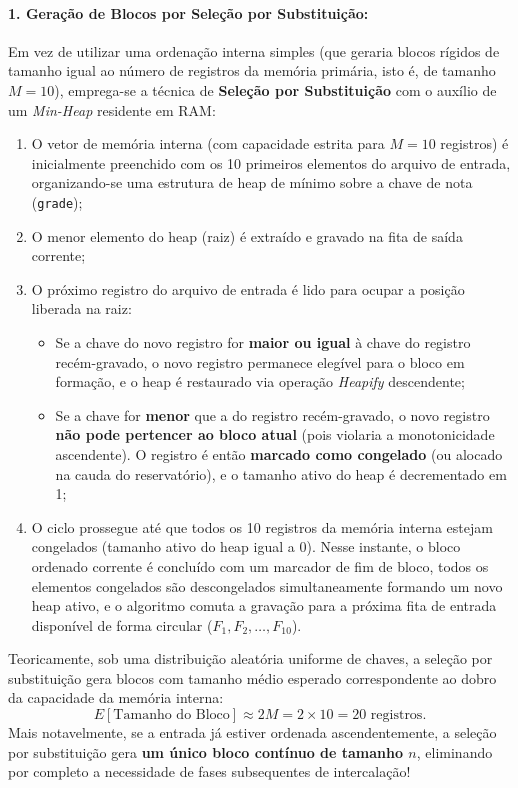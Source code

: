 \documentclass[12pt,a4paper]{article}
\begin{document}
\paragraph{1. Geração de Blocos por Seleção por Substituição:}
Em vez de utilizar uma ordenação interna simples (que geraria blocos rígidos de tamanho igual ao número de registros da memória primária, isto é, de tamanho $M = 10$), emprega-se a técnica de \textbf{Seleção por Substituição} com o auxílio de um \textit{Min-Heap} residente em RAM:
\begin{enumerate}
    \item O vetor de memória interna (com capacidade estrita para $M = 10$ registros) é inicialmente preenchido com os 10 primeiros elementos do arquivo de entrada, organizando-se uma estrutura de heap de mínimo sobre a chave de nota (\texttt{grade});
    \item O menor elemento do heap (raiz) é extraído e gravado na fita de saída corrente;
    \item O próximo registro do arquivo de entrada é lido para ocupar a posição liberada na raiz:
    \begin{itemize}
        \item Se a chave do novo registro for \textbf{maior ou igual} à chave do registro recém-gravado, o novo registro permanece elegível para o bloco em formação, e o heap é restaurado via operação \textit{Heapify} descendente;
        \item Se a chave for \textbf{menor} que a do registro recém-gravado, o novo registro \textbf{não pode pertencer ao bloco atual} (pois violaria a monotonicidade ascendente). O registro é então \textbf{marcado como congelado} (ou alocado na cauda do reservatório), e o tamanho ativo do heap é decrementado em 1;
    \end{itemize}
    \item O ciclo prossegue até que todos os 10 registros da memória interna estejam congelados (tamanho ativo do heap igual a 0). Nesse instante, o bloco ordenado corrente é concluído com um marcador de fim de bloco, todos os elementos congelados são descongelados simultaneamente formando um novo heap ativo, e o algoritmo comuta a gravação para a próxima fita de entrada disponível de forma circular ($F_1, F_2, \dots, F_{10}$).
\end{enumerate}

Teoricamente, sob uma distribuição aleatória uniforme de chaves, a seleção por substituição gera blocos com tamanho médio esperado correspondente ao dobro da capacidade da memória interna:
\begin{equation}
    E[\text{Tamanho do Bloco}] \approx 2M = 2 \times 10 = 20 \text{ registros}.
\end{equation}
Mais notavelmente, se a entrada já estiver ordenada ascendentemente, a seleção por substituição gera \textbf{um único bloco contínuo de tamanho $n$}, eliminando por completo a necessidade de fases subsequentes de intercalação!
\end{document}

